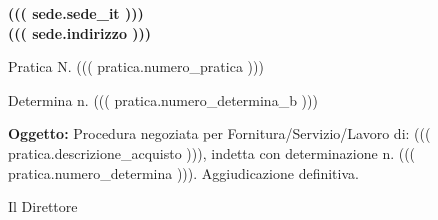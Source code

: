 \documentclass[a4paper,12pt]{letter}
\begin{document}
\vspace{-2.5cm}
\begin{center}
\small \bf
((( sede.sede_it ))) \\
((( sede.indirizzo )))
\end{center}

\thispagestyle{empty}
\vspace{1cm}

{\small Pratica N. ((( pratica.numero_pratica ))) }
\vspace{1cm}

\begin{flushright}

Determina n. ((( pratica.numero_determina_b )))
\end{flushright}

{\bf Oggetto:} Procedura negoziata per  Fornitura/Servizio/Lavoro di: ((( pratica.descrizione_acquisto ))),
indetta con determinazione  n. ((( pratica.numero_determina ))). Aggiudicazione definitiva.

\begin{center}
Il Direttore
\end{center}

\vspace{0.5 cm}
\end{document}

